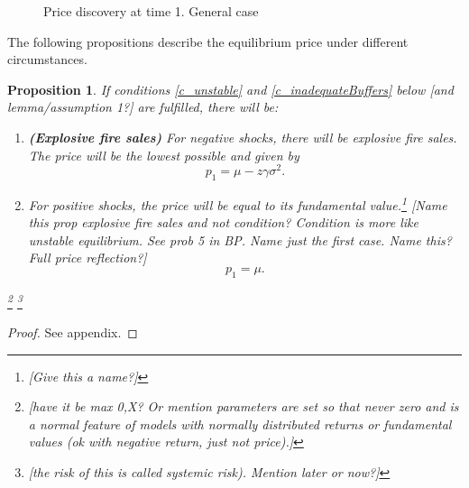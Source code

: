 \documentclass[11pt]{article}
\newtheorem{proposition}{Proposition}
\begin{document}
\begin{figure}[h]
\centering
{}
\caption{Price discovery at time 1. General case}
\label{fig:t1pricediscovery}
\end{figure}

The following propositions describe the equilibrium price under different circumstances.

\begin{proposition} \label{p_explosiveFiresales}
If conditions \ref{c_unstable} and \ref{c_inadequateBuffers} below [and lemma/assumption 1?] are fulfilled, there will be:

\begin{enumerate}[label = \roman*)]
\item[\textnormal{i)}] \textnormal{\textbf{(Explosive fire sales)}} For negative shocks, there will be explosive fire sales. The price will be the lowest possible and given by
\begin{equation}
p_1 = \mu - z\gamma\sigma^2.
\end{equation}
\item[\textnormal{ii)}]  For positive shocks, the price will be equal to its fundamental value.\footnote{[Give this a name?]}
[Name this prop explosive fire sales and not condition? Condition is more like unstable equilibrium. See prob 5 in BP. Name just the first case. Name this? Full price reflection?]
\begin{equation}
p_1 =  \mu.
\end{equation}
\end{enumerate}


\footnote{[have it be max 0,X? Or mention parameters are set so that never zero and is a normal feature of models with normally distributed returns or fundamental values (ok with negative return, just not price).]}
\footnote{[the risk of this is called systemic risk). Mention later or now?]}
\end{proposition}
\begin{proof}
See appendix.
\end{proof}
\end{document}
